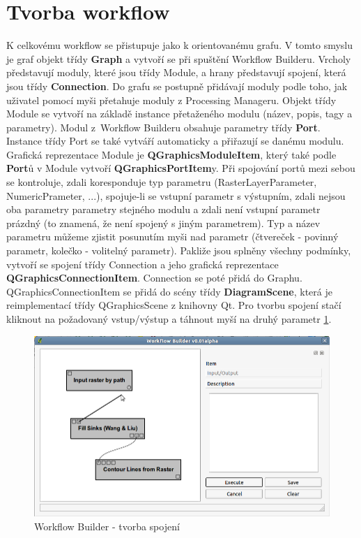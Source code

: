 \newpage
\section{Tvorba workflow}
K celkovému workflow se přistupuje jako k orientovanému grafu. V tomto
smyslu je graf objekt třídy \textbf{Graph} a vytvoří se při spuštění
Workflow Builderu. Vrcholy představují moduly, které jsou třídy
Module, a hrany představují spojení, která jsou
třídy \textbf{Connection}. Do grafu se postupně přidávají moduly podle
toho, jak uživatel pomocí myši přetahuje moduly z Processing
Manageru. Objekt třídy Module se vytvoří na základě instance
přetaženého modulu (název, popis, tagy a parametry). Modul z~Workflow
Build\-eru obsahuje parametry třídy \textbf{Port}. Instance třídy Port
se také vytváří automaticky a přiřazují se danému modulu. Grafická
reprezentace Module je \textbf{QGraphicsModuleItem}, který také
podle \textbf{Port}ů v Module vytvoří \textbf{QGraphicsPortItem}y. Při
spojování portů mezi sebou se kontroluje, zdali koresponduje typ
parametru (RasterLayerParameter, NumericPrameter, ...), spojuje-li se
vstupní parametr s výstupním, zdali nejsou oba parametry parametry
stejného modulu a zdali není vstupní parametr prázdný (to znamená, že
není spojený s jiným parametrem). Typ a název parametru můžeme zjistit
posunutím myši nad parametr (čtvereček - povinný parametr, kolečko -
volitelný parametr). Pakliže jsou splněny všechny podmínky, vytvoří se
spojení třídy Connection a jeho grafická
reprezentace \textbf{QGraphicsConnectionItem}. Connection se poté
přidá do Graphu. QGraphicsConnectionItem se přidá do scény
třídy \textbf{DiagramScene}, která je reimplementací třídy
QGraphicsScene z knihovny Qt. Pro tvorbu spojení stačí kliknout na
požadovaný vstup/výstup a táhnout myší na druhý
parametr \figurename \ref{wf:crCon}.

\begin{figure}[h]
	\centering
	\includegraphics[scale=0.4]{pictures/wf/wf_crCon}
	\caption{Workflow Builder - tvorba spojení}
  	\label{wf:crCon}
\end{figure}

